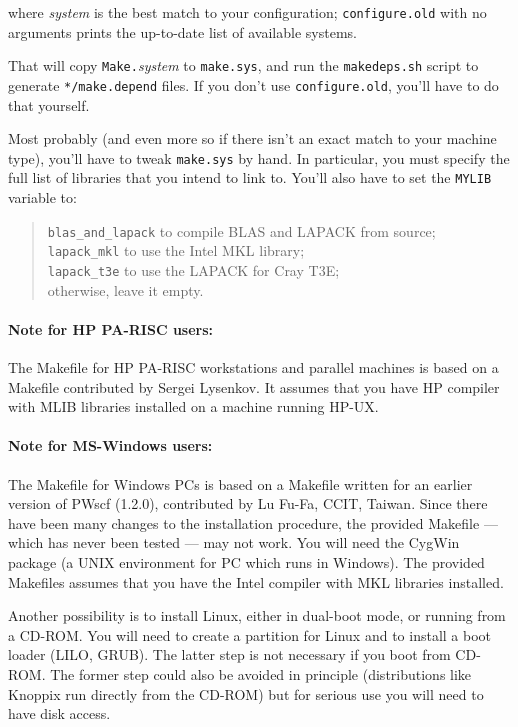 \documentclass[12pt,a4paper]{article}
\begin{document}
\noindent
where \emph{system} is the best match to your configuration;
\texttt{configure.old} with no arguments prints the up-to-date list of
available systems.

That will copy \texttt{Make.}\emph{system} to \texttt{make.sys}, and
run the \texttt{makedeps.sh} script to generate \texttt{*/make.depend}
files.  If you don't use \texttt{configure.old}, you'll have to do
that yourself.

Most probably (and even more so if there isn't an exact match to your
machine type), you'll have to tweak \texttt{make.sys} by hand.
In particular, you must specify the full list of libraries that
you intend to link to.
You'll also have to set the \texttt{MYLIB} variable to:
\begin{quote}
  \texttt{blas\_and\_lapack} to compile BLAS and LAPACK from source;\\
  \texttt{lapack\_mkl} to use the Intel MKL library;\\
  \texttt{lapack\_t3e} to use the LAPACK for Cray T3E;\\
  otherwise, leave it empty.
\end{quote}

\paragraph{Note for HP PA-RISC users:} 

The Makefile for HP PA-RISC workstations and parallel machines is
based on a Makefile contributed by Sergei Lysenkov.
It assumes that you have HP compiler with MLIB libraries installed on
a machine running HP-UX.

\paragraph{Note for MS-Windows users:} 

The Makefile for Windows PCs is based on a Makefile written for an
earlier version of PWscf (1.2.0), contributed by Lu Fu-Fa, CCIT,
Taiwan.
Since there have been many changes to the installation procedure, the
provided Makefile --- which has never been tested --- may not work.
You will need the CygWin package (a UNIX environment for PC which runs
in Windows).
The provided Makefiles assumes that you have the Intel compiler with
MKL libraries installed.

Another possibility is to install Linux, either in dual-boot mode, or
running from a CD-ROM.  You will need to create a partition for Linux
and to install a boot loader (LILO, GRUB).  The latter step is not
necessary if you boot from CD-ROM.  The former step could also be
avoided in principle (distributions like Knoppix run directly from the
CD-ROM) but for serious use you will need to have disk access.
\end{document}

